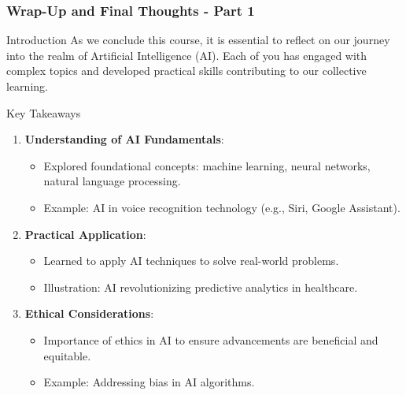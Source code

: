 \documentclass[aspectratio=169]{beamer}
\begin{document}
\begin{frame}[fragile]
    \frametitle{Wrap-Up and Final Thoughts - Part 1}

    \begin{block}{Introduction}
        As we conclude this course, it is essential to reflect on our journey into the realm of Artificial Intelligence (AI). Each of you has engaged with complex topics and developed practical skills contributing to our collective learning.
    \end{block}

    \begin{block}{Key Takeaways}
        \begin{enumerate}
            \item \textbf{Understanding of AI Fundamentals}:
                \begin{itemize}
                    \item Explored foundational concepts: machine learning, neural networks, natural language processing.
                    \item Example: AI in voice recognition technology (e.g., Siri, Google Assistant).
                \end{itemize}
            \item \textbf{Practical Application}:
                \begin{itemize}
                    \item Learned to apply AI techniques to solve real-world problems.
                    \item Illustration: AI revolutionizing predictive analytics in healthcare.
                \end{itemize}
            \item \textbf{Ethical Considerations}:
                \begin{itemize}
                    \item Importance of ethics in AI to ensure advancements are beneficial and equitable.
                    \item Example: Addressing bias in AI algorithms.
                \end{itemize}
        \end{enumerate}
    \end{block}
\end{frame}
\end{document}
